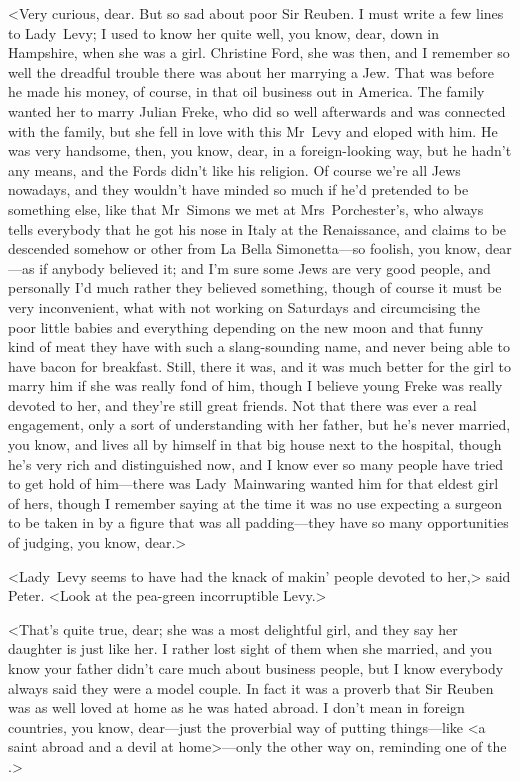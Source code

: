 <Very curious, dear. But so sad about poor Sir Reuben. I must write a few lines to Lady~Levy; I used to know her quite well, you know, dear, down in Hampshire, when she was a girl. Christine Ford, she was then, and I remember so well the dreadful trouble there was about her marrying a Jew. That was before he made his money, of course, in that oil business out in America. The family wanted her to marry Julian Freke, who did so well afterwards and was connected with the family, but she fell in love with this Mr~Levy and eloped with him. He was very handsome, then, you know, dear, in a foreign-looking way, but he hadn't any means, and the Fords didn't like his religion. Of course we're all Jews nowadays, and they wouldn't have minded so much if he'd pretended to be something else, like that Mr~Simons we met at Mrs~Porchester's, who always tells everybody that he got his nose in Italy at the Renaissance, and claims to be descended somehow or other from La Bella Simonetta—so foolish, you know, dear—as if anybody believed it; and I'm sure some Jews are very good people, and personally I'd much rather they believed something, though of course it must be very inconvenient, what with not working on Saturdays and circumcising the poor little babies and everything depending on the new moon and that funny kind of meat they have with such a slang-sounding name, and never being able to have bacon for breakfast. Still, there it was, and it was much better for the girl to marry him if she was really fond of him, though I believe young Freke was really devoted to her, and they're still great friends. Not that there was ever a real engagement, only a sort of understanding with her father, but he's never married, you know, and lives all by himself in that big house next to the hospital, though he's very rich and distinguished now, and I know ever so many people have tried to get hold of him—there was Lady~Mainwaring wanted him for that eldest girl of hers, though I remember saying at the time it was no use expecting a surgeon to be taken in by a figure that was all padding—they have so many opportunities of judging, you know, dear.>

<Lady~Levy seems to have had the knack of makin' people devoted to her,> said Peter. <Look at the pea-green incorruptible Levy.>

<That's quite true, dear; she was a most delightful girl, and they say her daughter is just like her. I rather lost sight of them when she married, and you know your father didn't care much about business people, but I know everybody always said they were a model couple. In fact it was a proverb that Sir Reuben was as well loved at home as he was hated abroad. I don't mean in foreign countries, you know, dear—just the proverbial way of putting things—like <a saint abroad and a devil at home>—only the other way on, reminding one of the .>

